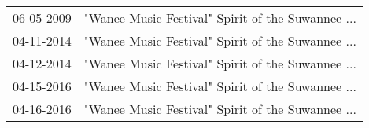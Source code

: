 \begin{supertabular}{ll}
 06-05-2009 &  "Wanee Music Festival" Spirit of the Suwannee ... \\
 04-11-2014 &  "Wanee Music Festival" Spirit of the Suwannee ... \\
 04-12-2014 &  "Wanee Music Festival" Spirit of the Suwannee ... \\
 04-15-2016 &  "Wanee Music Festival" Spirit of the Suwannee ... \\
 04-16-2016 &  "Wanee Music Festival" Spirit of the Suwannee ... \\
\end{supertabular}
